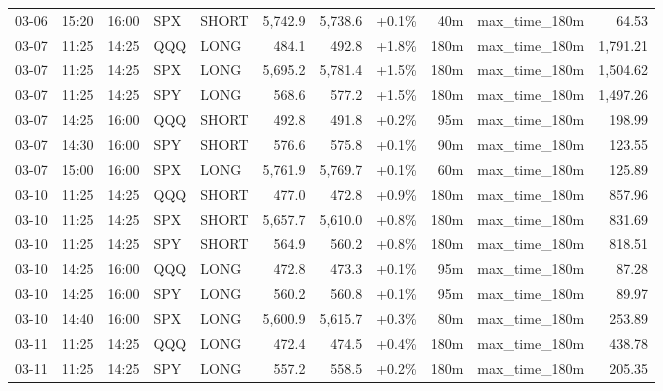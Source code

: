 \documentclass[11pt,a4paper,twoside]{article}
\begin{document}
\begin{center}
\begin{longtable}{>{\color{txtmain}}l l l l l r r r r >{\color{txtmain}}l r}
03-06 & 15:20 & 16:00 & SPX & SHORT & 5,742.9 & 5,738.6 & \textcolor{wingreen}{+0.1\%} & 40m & max\_time\_180m & \textcolor{wingreen}{64.53} \\
03-07 & 11:25 & 14:25 & QQQ & LONG & 484.1 & 492.8 & \textcolor{wingreen}{+1.8\%} & 180m & max\_time\_180m & \textcolor{wingreen}{1,791.21} \\
03-07 & 11:25 & 14:25 & SPX & LONG & 5,695.2 & 5,781.4 & \textcolor{wingreen}{+1.5\%} & 180m & max\_time\_180m & \textcolor{wingreen}{1,504.62} \\
03-07 & 11:25 & 14:25 & SPY & LONG & 568.6 & 577.2 & \textcolor{wingreen}{+1.5\%} & 180m & max\_time\_180m & \textcolor{wingreen}{1,497.26} \\
03-07 & 14:25 & 16:00 & QQQ & SHORT & 492.8 & 491.8 & \textcolor{wingreen}{+0.2\%} & 95m & max\_time\_180m & \textcolor{wingreen}{198.99} \\
03-07 & 14:30 & 16:00 & SPY & SHORT & 576.6 & 575.8 & \textcolor{wingreen}{+0.1\%} & 90m & max\_time\_180m & \textcolor{wingreen}{123.55} \\
03-07 & 15:00 & 16:00 & SPX & LONG & 5,761.9 & 5,769.7 & \textcolor{wingreen}{+0.1\%} & 60m & max\_time\_180m & \textcolor{wingreen}{125.89} \\
03-10 & 11:25 & 14:25 & QQQ & SHORT & 477.0 & 472.8 & \textcolor{wingreen}{+0.9\%} & 180m & max\_time\_180m & \textcolor{wingreen}{857.96} \\
03-10 & 11:25 & 14:25 & SPX & SHORT & 5,657.7 & 5,610.0 & \textcolor{wingreen}{+0.8\%} & 180m & max\_time\_180m & \textcolor{wingreen}{831.69} \\
03-10 & 11:25 & 14:25 & SPY & SHORT & 564.9 & 560.2 & \textcolor{wingreen}{+0.8\%} & 180m & max\_time\_180m & \textcolor{wingreen}{818.51} \\
03-10 & 14:25 & 16:00 & QQQ & LONG & 472.8 & 473.3 & \textcolor{wingreen}{+0.1\%} & 95m & max\_time\_180m & \textcolor{wingreen}{87.28} \\
03-10 & 14:25 & 16:00 & SPY & LONG & 560.2 & 560.8 & \textcolor{wingreen}{+0.1\%} & 95m & max\_time\_180m & \textcolor{wingreen}{89.97} \\
03-10 & 14:40 & 16:00 & SPX & LONG & 5,600.9 & 5,615.7 & \textcolor{wingreen}{+0.3\%} & 80m & max\_time\_180m & \textcolor{wingreen}{253.89} \\
03-11 & 11:25 & 14:25 & QQQ & LONG & 472.4 & 474.5 & \textcolor{wingreen}{+0.4\%} & 180m & max\_time\_180m & \textcolor{wingreen}{438.78} \\
03-11 & 11:25 & 14:25 & SPY & LONG & 557.2 & 558.5 & \textcolor{wingreen}{+0.2\%} & 180m & max\_time\_180m & \textcolor{wingreen}{205.35} \\

\end{longtable}
\end{center}
\end{document}

